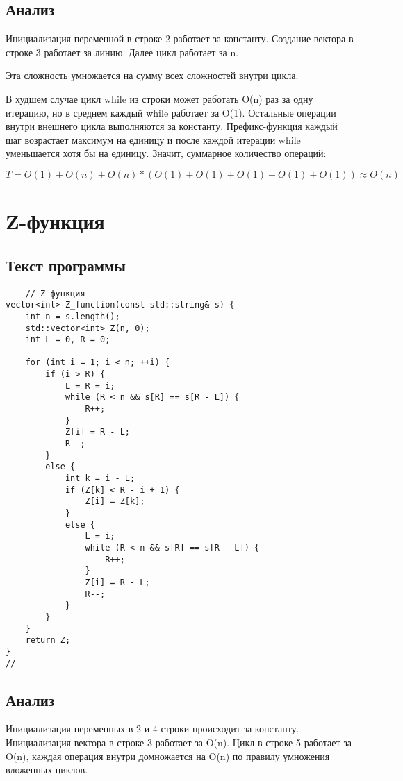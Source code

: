 \documentclass[bachelor, och, referat, times]{SCWorks}
\begin{document}
    \subsection{Анализ}

 Инициализация переменной в строке 2 работает за константу. 
 Создание вектора в строке 3 работает за линию.
Далее цикл работает за n. 

Эта сложность умножается на сумму всех сложностей внутри цикла.

В худшем случае цикл while из строки  может работать O(n) раз за одну итерацию, 
но в среднем каждый while работает за O(1).
Остальные операции внутри внешнего цикла выполняются за константу. 
Префикс-функция каждый шаг возрастает максимум на единицу 
и после каждой итерации while уменьшается хотя бы на единицу.
Значит, суммарное количество операций:


$T = O(1) + O(n) + O(n) * (O(1) + O(1) + O(1) + O(1) + O(1)) \approx  O(n)$


\section{Z-функция}
\subsection{Текст программы}
\begin{verbatim}
    // Z функция
vector<int> Z_function(const std::string& s) {
    int n = s.length();
    std::vector<int> Z(n, 0);
    int L = 0, R = 0;

    for (int i = 1; i < n; ++i) {
        if (i > R) {
            L = R = i;
            while (R < n && s[R] == s[R - L]) {
                R++;
            }
            Z[i] = R - L;
            R--;
        }
        else {
            int k = i - L;
            if (Z[k] < R - i + 1) {
                Z[i] = Z[k];
            }
            else {
                L = i;
                while (R < n && s[R] == s[R - L]) {
                    R++;
                }
                Z[i] = R - L;
                R--;
            }
        }
    }
    return Z;
}
//
\end{verbatim}

\subsection{Анализ}
Инициализация переменных в 2 и 4 строки происходит за константу. Инициализация вектора в строке 3 работает за O(n).
Цикл в строке 5 работает за O(n), каждая операция внутри домножается
на O(n) по правилу умножения вложенных циклов.
\end{document}

